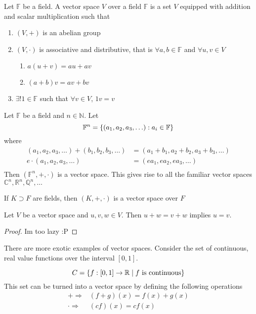 \documentclass[../notes.tex]{subfiles}
\begin{document}
\begin{definition}
	Let $\mathbb{F}$ be a field. A vector space $V$ over a field $\mathbb{F}$ is a set $V$ equipped with addition and scalar multiplication such that
	\begin{enumerate}
		\item $(V, +)$ is an abelian group
		\item $(V, \cdot)$ is associative and distributive, that is $\forall a,b \in \mathbb{F}$ and $\forall u,v \in V$
		\begin{enumerate}
			\item $a(u + v) = au + av$
			\item $(a + b)v = av + bv$
		\end{enumerate}
		\item $\exists! 1 \in \mathbb{F}$ such that $\forall v \in V$, $1v = v$
	\end{enumerate}
\end{definition}

\begin{example}
	Let $\mathbb{F}$ be a field and $n \in \mathbb{N}$. Let
	\[
		\mathbb{F}^n = \qty{ (a_1, a_2, a_3, \ldots) : a_i \in \mathbb{F}}
	\]
	where
	\begin{align*}
		(a_1, a_2, a_3, \ldots) + (b_1, b_2, b_3, \ldots) &= (a_1 + b_1, a_2+b_2, a_3+b_3,\ldots) \\
		e \cdot (a_1, a_2, a_3, \ldots) &= (ea_1, ea_2, ea_3,\ldots) \\
	\end{align*}
	Then $(\mathbb{F}^n, +, \cdot)$ is a vector space. This gives rise to all the familiar vector spaces $\mathbb{C}^n, \mathbb{R}^n, \mathbb{Q}^n, \ldots$
\end{example}
\begin{remark}
	If $K \supset F$ are fields, then $(K, +, \cdot)$ is a vector space over $F$
\end{remark}


\begin{theorem}
	Let $V$ be a vector space and $u,v,w \in V$. Then $u + w = v + w$ implies $u = v$.
\end{theorem}
\begin{proof}
	Im too lazy :P
\end{proof}

There are more exotic examples of vector spaces. Consider the set of continuous, real value functions over the interval $[0,1]$.

\begin{example}
	\[
		C = \qty{ f : [0,1] \to \mathbb{R} \;|\; f\text{ is continuous} }
	\]
	This set can be turned into a vector space by defining the following operations
	\begin{align*}
		+ \Rightarrow &(f+g)(x) = f(x) + g(x) \\
		\cdot \Rightarrow &(cf)(x) = cf(x) \\
	\end{align*}
\end{example}
\end{document}
